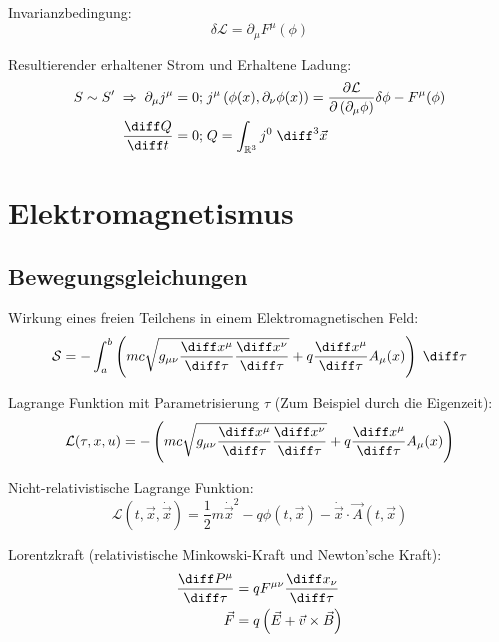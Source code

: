 \documentclass[11pt]{article}
\numberwithin{equation}{section}
\begin{document}
      Invarianzbedingung:
      \begin{equation}
        \delta\mathcal{L} = \partial_\mu F^\mu(\phi)
      \end{equation}

      Resultierender erhaltener Strom und Erhaltene Ladung:
      \begin{equation}
        \begin{aligned}
          S \sim S' \;\Rightarrow\;\partial_\mu j^\mu = 0;&\; j^\mu \left( \phi(x), \partial_\nu\phi(x) \right) = \pder{\mathcal{L}}{\left(\partial_\mu \phi\right)}\delta\phi - F^\mu(\phi) \\
          \tder{Q}{t} = 0;&\; Q = \int_{\mathbb{R}^3} j^0\;\diff^3\vec{x}
        \end{aligned}
      \end{equation}


  \newpage
	\section{Elektromagnetismus}
		\subsection{Bewegungsgleichungen}
			Wirkung eines freien Teilchens in einem Elektromagnetischen Feld:
			\begin{equation}
				\mathcal{S}=-\int_{a}^{b}\left(mc\sqrt{g_{\mu\nu}\frac{\diff x^\mu}{\diff \tau}\frac{\diff x^\nu}{\diff \tau}}
        + q\frac{\diff x^\mu}{\diff \tau}A_\mu(x)\right)\;\diff\tau
			\end{equation}

			Lagrange Funktion mit Parametrisierung $\tau$ (Zum Beispiel durch die Eigenzeit):
			\begin{equation}
				\mathcal{L} (\tau,x,u) =-\left(mc\sqrt{g_{\mu\nu}\frac{\diff x^\mu}{\diff \tau}\frac{\diff x^\nu}{\diff \tau}}
				+ q\frac{\diff x^\mu}{\diff \tau}A_\mu(x)\right)
			\end{equation}

			Nicht-relativistische Lagrange Funktion:
			\begin{equation}
				\mathcal{L}(t,\vec{x},\dot{\vec{x}}) = \frac{1}{2}m\dot{\vec{x}}^2 - q\phi(t,\vec{x}) - \dot{\vec{x}}\cdot\vec{A}(t,\vec{x})
			\end{equation}

			Lorentzkraft (relativistische Minkowski-Kraft und Newton'sche Kraft):
			\begin{equation}
        \begin{aligned}
          \frac{\diff P^\mu}{\diff \tau} &= q F^{\mu\nu}\frac{\diff x_\nu}{\diff \tau} \\
          \vec{F} &= q\left(\vec{E}+\vec{v}\times\vec{B}\right) \\
        \end{aligned}
			\end{equation}
\end{document}
